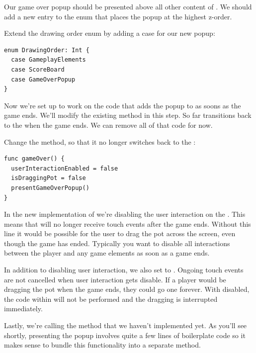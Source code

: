 Our game over popup should be presented above all other content of
. We should add a new entry to the
 enum that places the popup at the highest z-order.

\begin{leftbar}
Extend the drawing order enum by adding a case for our new popup:
\begin{lstlisting}
enum DrawingOrder: Int {
  case GameplayElements
  case ScoreBoard
  case GameOverPopup
}
\end{lstlisting}
\end{leftbar}

Now we're set up to work on the code that adds the popup to
 as soons as the game ends. We'll modify the existing
 method in this step. So far 
transitions back to the  when the game ends. We can
remove all of that code for now.

\begin{leftbar}
Change the  method, so that it no longer switches back to
the :
\begin{lstlisting}
func gameOver() {
  userInteractionEnabled = false
  isDraggingPot = false
  presentGameOverPopup()
}
\end{lstlisting}
\end{leftbar}

In the new implementation of  we're disabling the user
interaction on the . This means that
 will no longer receive touch events after the game ends.
Without this line it would be possible for the user to drag the pot across the screen, even though the game has ended. 
Typically you want to disable all interactions between the player and any game
elements as soon as a game ends.

In addition to disabling user interaction, we also set
 to . Ongoing touch events are not
cancelled when user interaction gets disable. If a player would be
dragging the pot when the game ends, they could go one forever.
With  disabled, the code within
 will not be performed and the dragging is interrupted immediately.

Lastly, we're calling the  method that we
haven't implemented yet. As you'll see shortly, presenting the popup involves
quite a few lines of boilerplate code so it makes sense to bundle this
functionality into a separate method.

